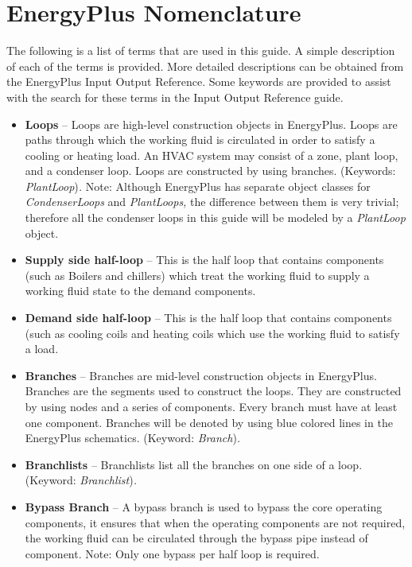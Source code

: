 \chapter{EnergyPlus Nomenclature}\label{energyplus-nomenclature}

The following is a list of terms that are used in this guide. A simple description of each of the terms is provided. More detailed descriptions can be obtained from the EnergyPlus Input Output Reference. Some keywords are provided to assist with the search for these terms in the Input Output Reference guide.

\begin{itemize}
\item
  \textbf{Loops} -- Loops are high-level construction objects in EnergyPlus. Loops are paths through which the working fluid is circulated in order to satisfy a cooling or heating load. An HVAC system may consist of a zone, plant loop, and a condenser loop. Loops are constructed by using branches. (Keywords: \emph{PlantLoop})\emph{.} Note: Although EnergyPlus has separate object classes for \emph{CondenserLoops} and \emph{PlantLoops,} the difference between them is very trivial; therefore all the condenser loops in this guide will be modeled by a \emph{PlantLoop} object.
\item
  \textbf{Supply side half-loop} -- This is the half loop that contains components (such as Boilers and chillers) which treat the working fluid to supply a working fluid state to the demand components.
\item
  \textbf{Demand side half-loop} -- This is the half loop that contains components (such as cooling coils and heating coils which use the working fluid to satisfy a load.
\item
  \textbf{Branches} -- Branches are mid-level construction objects in EnergyPlus. Branches are the segments used to construct the loops. They are constructed by using nodes and a series of components. Every branch must have at least one component. Branches will be denoted by using blue colored lines in the EnergyPlus schematics. (Keyword: \emph{Branch})\emph{.}
\item
  \textbf{Branchlists} -- Branchlists list all the branches on one side of a loop. (Keyword: \emph{Branchlist})\emph{.}
\item
  \textbf{Bypass Branch} -- A bypass branch is used to bypass the core operating components, it ensures that when the operating components are not required, the working fluid can be circulated through the bypass pipe instead of component. Note: Only one bypass per half loop is required.

\end{itemize}
